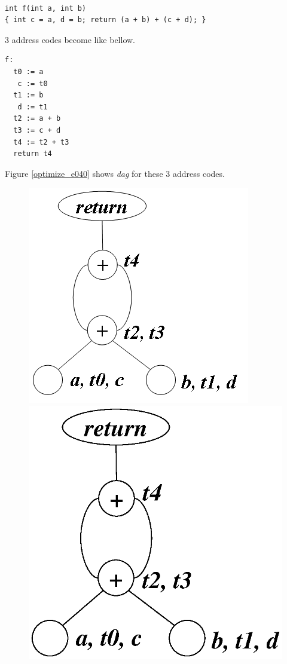 \begin{Example}
\label{optimize_e039}
\begin{verbatim}

int f(int a, int b)
{ int c = a, d = b; return (a + b) + (c + d); }
\end{verbatim}
3 address codes become like bellow.
\begin{verbatim}
f:
  t0 := a
   c := t0
  t1 := b
   d := t1
  t2 := a + b
  t3 := c + d
  t4 := t2 + t3
  return t4
\end{verbatim}
Figure \ref{optimize_e040} shows {\em dag} for these 3 address codes.
\begin{figure}[htbp]
\begin{center}
\begin{htmlonly}
\includegraphics[width=0.724\linewidth,height=0.7\linewidth]{opt021.png}
\end{htmlonly}
\begin{latexonly}
\includegraphics[width=0.724\linewidth,height=0.7\linewidth]{opt021.eps}

\end{latexonly}
\end{center}
\end{figure}
\end{Example}
